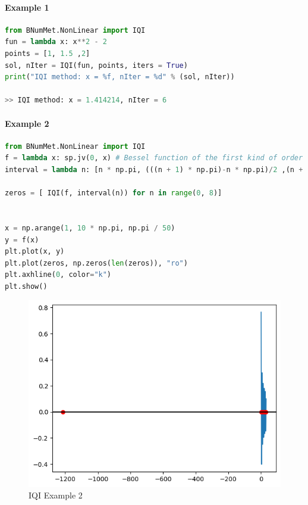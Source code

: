 \paragraph{Example 1}{
\begin{lstlisting}[language=Python]
from BNumMet.NonLinear import IQI
fun = lambda x: x**2 - 2
points = [1, 1.5 ,2]
sol, nIter = IQI(fun, points, iters = True)
print("IQI method: x = %f, nIter = %d" % (sol, nIter))

>> IQI method: x = 1.414214, nIter = 6
\end{lstlisting}
}
\paragraph{Example 2}{
\begin{lstlisting}[language=Python]
from BNumMet.NonLinear import IQI
f = lambda x: sp.jv(0, x) # Bessel function of the first kind of order 0
interval = lambda n: [n * np.pi, (((n + 1) * np.pi)-n * np.pi)/2 ,(n + 1) * np.pi] # Interval for the n-th zero

zeros = [ IQI(f, interval(n)) for n in range(0, 8)]


x = np.arange(1, 10 * np.pi, np.pi / 50)
y = f(x)
plt.plot(x, y)
plt.plot(zeros, np.zeros(len(zeros)), "ro")
plt.axhline(0, color="k")
plt.show()
\end{lstlisting}

\begin{figure}[H]
    \centering
    \includegraphics{Include/Images/Thesis/Documentation/NonLinear/IQI Example 2.png}
    \caption{IQI Example 2}
    \label{fig:IQI Example 2}
\end{figure}
}